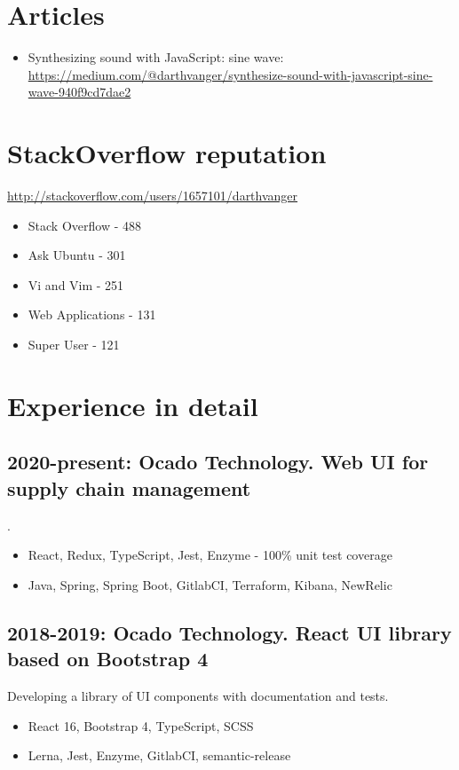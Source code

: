 \documentclass[a4paper, 14pt]{article}
\begin{document}
\section{Articles}
  \begin{itemize}
    \item Synthesizing sound with JavaScript: sine wave: \url{https://medium.com/@darthvanger/synthesize-sound-with-javascript-sine-wave-940f9cd7dae2}
  \end{itemize}

\section{StackOverflow reputation}
  \url{http://stackoverflow.com/users/1657101/darthvanger} \\
  \begin{itemize}
    \item Stack Overflow - 488 \\
    \item Ask Ubuntu - 301 \\
    \item Vi and Vim - 251 \\
    \item Web Applications - 131 \\
    \item Super User - 121 \\
  \end{itemize}

\section{Experience in detail}
  \subsection{2020-present: Ocado Technology. Web UI for supply chain management}.
    \begin{itemize}
      \item React, Redux, TypeScript, Jest, Enzyme - 100\% unit test coverage \\
      \item Java, Spring, Spring Boot, GitlabCI, Terraform, Kibana, NewRelic
    \end{itemize}
  \subsection{2018-2019: Ocado Technology. React UI library based on Bootstrap 4}
    Developing a library of UI components with documentation and tests.
    \begin{itemize}
      \item React 16, Bootstrap 4, TypeScript, SCSS \\ 
      \item Lerna, Jest, Enzyme, GitlabCI, semantic-release
    \end{itemize}
\end{document}
